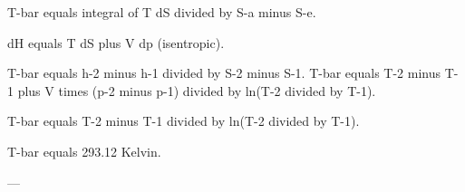 T-bar equals integral of T dS divided by S-a minus S-e.  

dH equals T dS plus V dp (isentropic).  

T-bar equals h-2 minus h-1 divided by S-2 minus S-1.  
T-bar equals T-2 minus T-1 plus V times (p-2 minus p-1) divided by ln(T-2 divided by T-1).  

T-bar equals T-2 minus T-1 divided by ln(T-2 divided by T-1).  

T-bar equals 293.12 Kelvin.  

---